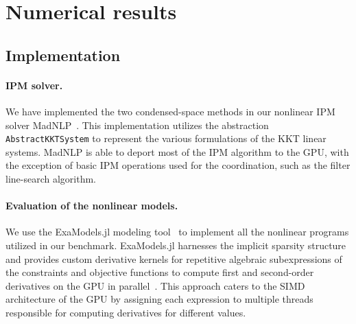 \section{Numerical results}

\subsection{Implementation}

\paragraph{IPM solver.}
We have implemented the two condensed-space methods in our nonlinear IPM solver MadNLP~\cite{shin2021graph}.
This implementation utilizes the abstraction {\tt AbstractKKTSystem} to represent the various formulations of the KKT linear systems.
MadNLP is able to deport most of the IPM algorithm to the GPU, with the exception of basic IPM operations used for the coordination, such as the filter line-search algorithm.

\paragraph{Evaluation of the nonlinear models.}
We use the ExaModels.jl modeling tool~\cite{shin2023accelerating} to implement all the nonlinear programs utilized in our benchmark.
ExaModels.jl harnesses the implicit sparsity structure and provides custom derivative kernels for repetitive algebraic subexpressions of the constraints and objective functions to compute first and second-order derivatives on the GPU in parallel~\cite{bischof1991exploiting,enzyme2021}.
This approach caters to the SIMD architecture of the GPU by assigning each expression to multiple threads responsible for computing derivatives for different values.

